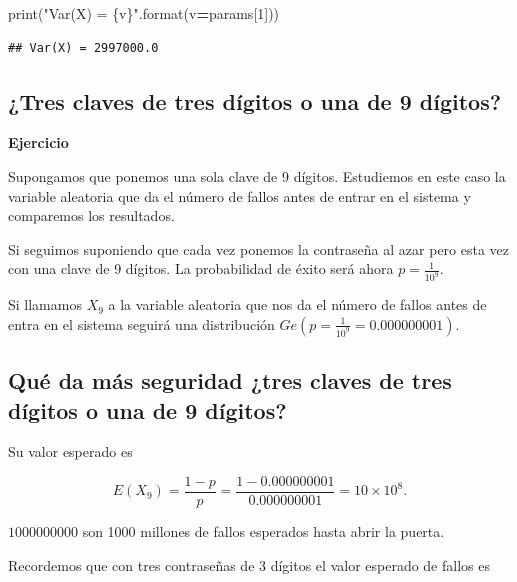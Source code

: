 \documentclass[]{book}
\newenvironment{Shaded}{\begin{snugshade}}{\end{snugshade}}
\newcommand{\BuiltInTok}[1]{#1}
\newcommand{\DecValTok}[1]{\textcolor[rgb]{0.00,0.00,0.81}{#1}}
\newcommand{\NormalTok}[1]{#1}
\newcommand{\OperatorTok}[1]{\textcolor[rgb]{0.81,0.36,0.00}{\textbf{#1}}}
\newcommand{\SpecialCharTok}[1]{\textcolor[rgb]{0.00,0.00,0.00}{#1}}
\newcommand{\StringTok}[1]{\textcolor[rgb]{0.31,0.60,0.02}{#1}}
\begin{document}
\begin{Shaded}
\begin{Highlighting}[]
\BuiltInTok{print}\NormalTok{(}\StringTok{"Var(X) = }\SpecialCharTok{\{v\}}\StringTok{"}\NormalTok{.}\BuiltInTok{format}\NormalTok{(v}\OperatorTok{=}\NormalTok{params[}\DecValTok{1}\NormalTok{]))}
\end{Highlighting}
\end{Shaded}

\begin{verbatim}
## Var(X) = 2997000.0
\end{verbatim}

\hypertarget{tres-claves-de-tres-duxedgitos-o-una-de-9-duxedgitos}{%
\subsection{¿Tres claves de tres dígitos o una de 9 dígitos?}\label{tres-claves-de-tres-duxedgitos-o-una-de-9-duxedgitos}}

\textbf{Ejercicio}

Supongamos que ponemos una sola clave de 9 dígitos. Estudiemos en este caso la variable aleatoria que da el número de fallos antes de entrar en el sistema y comparemos los resultados.

Si seguimos suponiendo que cada vez ponemos la contraseña al azar pero esta vez con una clave de 9 dígitos. La probabilidad de éxito será ahora \(p=\frac{1}{10^{9}}\).

Si llamamos \(X_9\) a la variable aleatoria que nos da el número de fallos antes de entra en el sistema seguirá una distribución \(Ge(p=\frac{1}{10^9}=0.000000001)\).

\hypertarget{quuxe9-da-muxe1s-seguridad-tres-claves-de-tres-duxedgitos-o-una-de-9-duxedgitos}{%
\subsection{Qué da más seguridad ¿tres claves de tres dígitos o una de 9 dígitos?}\label{quuxe9-da-muxe1s-seguridad-tres-claves-de-tres-duxedgitos-o-una-de-9-duxedgitos}}

Su valor esperado es

\[
E(X_9)=\frac{1-p}{p}=\frac{1-0.000000001}{0.000000001}=\ensuremath{10\times 10^{8}}.
\]

\(1000 000 000\) son 1000 millones de fallos esperados hasta abrir la puerta.

Recordemos que con tres contraseñas de 3 dígitos el valor esperado de fallos es
\end{document}
